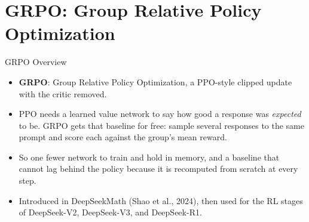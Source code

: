 \section{GRPO: Group Relative Policy Optimization}

\begin{frame}{GRPO Overview}
    \begin{itemize}\itemsep0.35em
        \item \textbf{GRPO}: Group Relative Policy Optimization, a PPO-style clipped update with the critic removed.
        \item PPO needs a learned value network to say how good a response was \emph{expected} to be. GRPO gets that baseline for free: sample several responses to the same prompt and score each against the group's mean reward.
        \item So one fewer network to train and hold in memory, and a baseline that cannot lag behind the policy because it is recomputed from scratch at every step.
        \item Introduced in DeepSeekMath (Shao et al., 2024), then used for the RL stages of DeepSeek-V2, DeepSeek-V3, and DeepSeek-R1.
    \end{itemize}
\end{frame}

